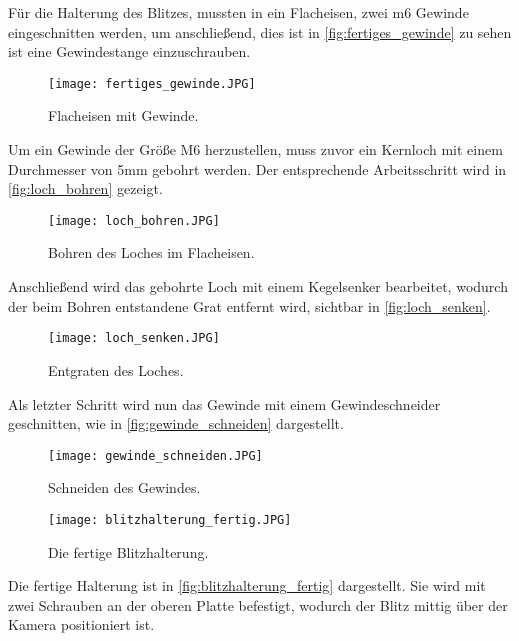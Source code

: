 Für die Halterung des Blitzes, mussten in ein Flacheisen, zwei m6 Gewinde
eingeschnitten werden, um anschließend, dies ist in \autoref{fig:fertiges_gewinde}
zu sehen ist eine Gewindestange einzuschrauben.

\begin{figure}[H]
    \centering
    \texttt{[image: fertiges\_gewinde.JPG]}
    \caption{Flacheisen mit Gewinde.}
    \label{fig:fertiges_gewinde}
\end{figure}

\newpage

Um ein Gewinde der Größe M6 herzustellen, muss zuvor ein Kernloch mit einem
Durchmesser von 5mm gebohrt werden. Der entsprechende Arbeitsschritt wird in
\autoref{fig:loch_bohren} gezeigt.

\begin{figure}[H]
    \centering
    \texttt{[image: loch\_bohren.JPG]}
    \caption{Bohren des Loches im Flacheisen.}
    \label{fig:loch_bohren}
\end{figure}

Anschließend wird das gebohrte Loch mit einem Kegelsenker bearbeitet, wodurch
der beim Bohren entstandene Grat entfernt wird, sichtbar in \autoref{fig:loch_senken}.

\begin{figure}[H]
    \centering
    \texttt{[image: loch\_senken.JPG]}
    \caption{Entgraten des Loches.}
    \label{fig:loch_senken}
\end{figure}

\newpage

Als letzter Schritt wird nun das Gewinde mit einem Gewindeschneider geschnitten,
wie in \autoref{fig:gewinde_schneiden} dargestellt.

\begin{figure}[H]
    \centering
    \texttt{[image: gewinde\_schneiden.JPG]}
    \caption{Schneiden des Gewindes.}
    \label{fig:gewinde_schneiden}
\end{figure}

\begin{figure}[H]
    \centering
    \texttt{[image: blitzhalterung\_fertig.JPG]}
    \caption{Die fertige Blitzhalterung.}
    \label{fig:blitzhalterung_fertig}
\end{figure}

Die fertige Halterung ist in \autoref{fig:blitzhalterung_fertig} dargestellt.
Sie wird mit zwei Schrauben an der oberen Platte befestigt, wodurch der Blitz
mittig über der Kamera positioniert ist.

